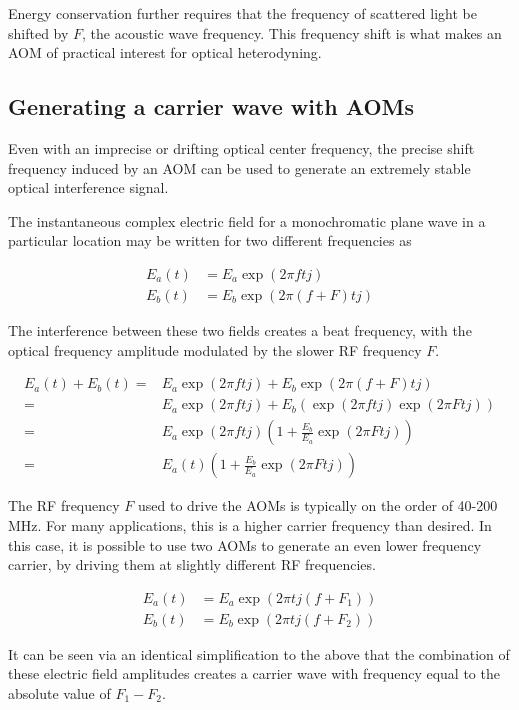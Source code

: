 Energy conservation further requires that the frequency of scattered light be shifted by $F$, the acoustic wave frequency. \cite{haus} This frequency shift is what makes an AOM of practical interest for optical heterodyning.

\subsection{Generating a carrier wave with AOMs}
\label{sec:aom_carrier}

Even with an imprecise or drifting optical center frequency, the precise shift frequency induced by an AOM can be used to generate an extremely stable optical interference signal. \cite{hitzenberger}

The instantaneous complex electric field for a monochromatic plane wave in a particular location may be written for two different frequencies as

\begin{align}
E_a(t) & = E_a \exp{(2 \pi ft j)} \\
E_b(t) & = E_b \exp{(2 \pi (f + F)t j)}
\end{align}

The interference between these two fields creates a beat frequency, with the optical frequency amplitude modulated by the slower RF frequency $F$.

\begin{align}
E_a(t) + E_b(t) = & E_a \exp{(2 \pi ftj)} + E_b \exp{(2 \pi (f + F)t j)} \\
= & E_a \exp{(2 \pi ftj)} + E_b (\exp{(2 \pi ftj)} \exp{(2 \pi Ftj)}) \\
= & E_a \exp{(2 \pi ftj)} (1 + \frac{E_b}{E_a} \exp{(2 \pi Ftj)}) \\
= & E_a(t) (1 + \frac{E_b}{E_a} \exp{(2 \pi Ftj)})
\end{align}

The RF frequency $F$ used to drive the AOMs is typically on the order of 40-200 MHz. For many applications, this is a higher carrier frequency than desired. In this case, it is possible to use two AOMs to generate an even lower frequency carrier, by driving them at slightly different RF frequencies.

\begin{align}
E_a(t) & = E_a \exp{(2 \pi t j (f + F_1))} \\
E_b(t) & = E_b \exp{(2 \pi t j (f + F_2))}
\end{align}

It can be seen via an identical simplification to the above that the combination of these electric field amplitudes creates a carrier wave with frequency equal to the absolute value of $F_1 - F_2$.


